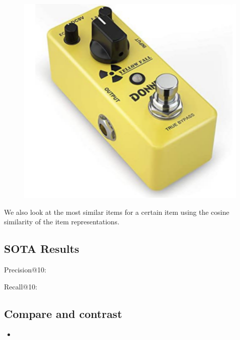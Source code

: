 \documentclass{article}
\begin{document}
\begin{figure}[h]
\begin{minipage}{.3\textwidth}
\end{minipage}
\begin{minipage}{.3\textwidth}
  \centering
  \includegraphics[width=.9\linewidth]{DSC210_Project_Report/images/recommendation3.png}
\end{minipage}
\label{fig:bpr_recommendations}
\end{figure}
We also look at the most similar items for a certain item using the cosine similarity of the item representations.

\subsection{SOTA Results}

Precision@10:

Recall@10:

\subsection{Compare and contrast}
\begin{itemize}
    \item
\end{itemize}
\end{document}
